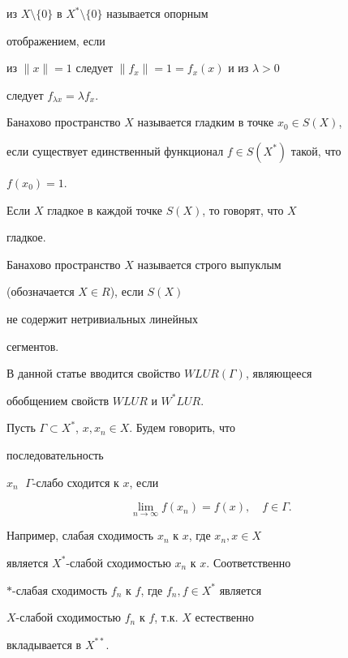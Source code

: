 из $X\setminus\{0\}$ в $X^*\setminus\{0\}$ называется опорным 


отображением, если 


из $\|x\|=1$ следует $\|f_x\|=1=f_x(x)$ и из $\lambda>0$ 


следует $f_{\lambda x}=\lambda f_x$. 


 


Банахово пространство $X$ называется гладким в точке $x_0\in S(X)$, 


если существует единственный функционал $f\in S(X^*)$ такой, что 


$f(x_0)=1$. 


Если $X$ гладкое в каждой точке $S(X)$, то говорят, что $X$ 


гладкое. 


 


Банахово пространство $X$ называется строго выпуклым 


(обозначается $X\in R$), если $S(X)$ 


не содержит нетривиальных линейных 


сегментов. 


 


В данной статье вводится свойство $WLUR(\Gamma)$, являющееся 


обобщением свойств $WLUR$ и $W^*LUR$. 


 


Пусть $\Gamma\subset X^*$, $x,x_n\in X$. Будем говорить, что 


последовательность 


$x_n$ $\;\Gamma$-слабо сходится к $x$, если 


$$ 


\lim_{n\to\infty}f(x_n)=f(x),\quad f\in\Gamma. 


$$ 


 


Например, слабая сходимость $x_n$ к $x$, где $x_n,x\in X$ 


является $X^*$-слабой сходимостью $x_n$ к $x$. Соответственно 


$\ast$-слабая сходимость $f_n$ к $f$, где $f_n,f\in X^*$ является 


$X$-слабой сходимостью $f_n$ к $f$, т.к. $X$ естественно 


вкладывается в $X^{**}$. 


